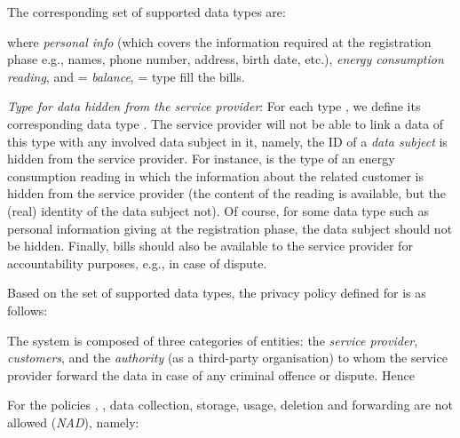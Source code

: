 \documentclass[a4paper]{article}
\begin{document}
The corresponding set of supported data types are: 

\begin{center}
\noindent{}
\end{center} 

where   \textit{personal info} (which covers  the information required at the registration phase e.g., names, phone number, address, birth date, etc.),   \textit{energy consumption reading}, and  = \textit{balance},  = type fill the bills. 

\textit{Type for data hidden from the service provider}: For each type , we define its corresponding data type . The service provider will not be able to link a data of this type with any involved data subject in it, namely,  the ID of a \textit{data subject} is hidden from the service provider.  For instance,  is the type of an energy consumption reading in which the information about the related customer is hidden from the service provider (the content of the reading is available, but the (real) identity of the data subject  not). Of course, for some data type such as personal information giving at the registration phase, the data subject should not be hidden. Finally, bills should also be available to the service provider for accountability purposes, e.g., in case of dispute.   

Based on the set of supported data types, the privacy policy defined for  
is as follows: 

\begin{center}
\noindent\fbox{\parbox{11cm}{\begin{center}
 = \{, , , ,  , \}   
\end{center} 
     }
}
\end{center} 

The system is composed of three categories of entities: the \textit{service provider}, \textit{customers}, and the\textit{ authority} (as a third-party organisation) to whom the service provider forward the data in case of any criminal offence or dispute. Hence   

\begin{center}
\noindent{}
\end{center}  

For the policies  , , data collection, storage, usage, deletion and forwarding are not allowed (\textit{NAD}), namely:
\end{document}
